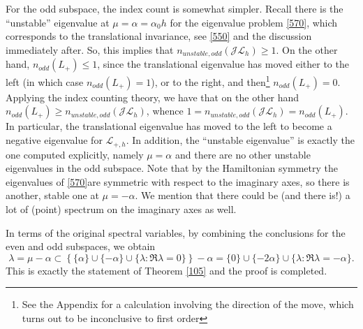\documentclass[12pt]{amsart}
\theoremstyle{definition}
\theoremstyle{remark}
\numberwithin{equation}{section}
\renewcommand{\(}{\left(}
\renewcommand{\)}{\right)}
\renewcommand{\[}{\left[}
\renewcommand{\]}{\right]}
\newcommand{\cl}{{\mathcal L}}
\newcommand{\al}{\alpha}
\newcommand{\la}{\lambda}
\newcommand{\cj}{{\mathcal J}}
\begin{document}
For the odd subspace, the index count is somewhat simpler.
Recall  there is the ``unstable'' eigenvalue at $\mu=\al=\al_0 h$ for the eigenvalue problem \eqref{570}, which
corresponds to the translational invariance,  see \eqref{550} and the discussion immediately after. So, this implies that $n_{unstable, odd}(\cj \cl_h)\geq 1$. On the other hand, $n_{odd}(L_+)\leq 1$, since the translational eigenvalue has moved either to the left (in which case $n_{odd}(L_+)=1$), or to the right, and then\footnote{See the Appendix for a calculation involving the direction of the move, which turns out to be  inconclusive to first order}  $n_{odd}(L_+)=0$. Applying the index counting theory, we have that on the other hand $n_{odd}(L_+)\geq n_{unstable,odd}(\cj \cl_h)$, whence $1=n_{unstable, odd}(\cj \cl_h)=n_{odd}(L_+)$. In particular, the translational eigenvalue has moved to the left to become a negative eigenvalue  for $\cl_{+,h}$. In addition, the ``unstable eigenvalue'' is exactly the one computed explicitly, namely $\mu=\al$ and there are no other unstable eigenvalues in the odd subspace. Note that by the Hamiltonian symmetry the eigenvalues of \eqref{570}are symmetric with respect to the imaginary axes, so there is another, stable  one at $\mu=-\al$. We mention that there could be (and there is!) a lot of (point) spectrum on the imaginary axes as well.

In terms of the  original spectral
variables, by combining the conclusions for the even and odd subspaces, we obtain
$$
\la=\mu-\al\subset \left\{\{\al\}\cup\{-\al\} \cup \{\la: \Re \la=0\} \right\} - \al =   \{0\}\cup\{-2\al\} \cup \{\la: \Re \la=-\al\}.
$$
  This is exactly the statement of Theorem  \ref{105} and the proof is completed.
\appendix
\end{document}
